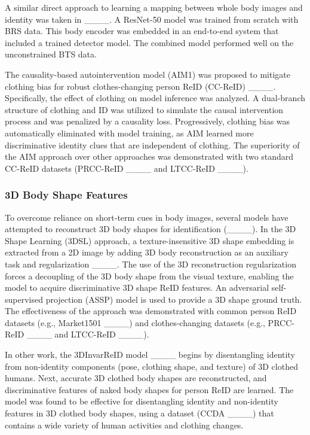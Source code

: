 A similar direct approach to learning a mapping between 
whole body images and identity was taken in ____.  A ResNet-50 model was trained from scratch
with BRS data. This body encoder was embedded
in an end-to-end system that included a trained detector
model. The combined model performed well on the unconstrained BTS data.

The causality-based autointervention model (AIM1) was
proposed to mitigate clothing bias for robust clothes-changing person ReID
(CC-ReID) ____. Specifically, 
 the effect of clothing
on model inference was analyzed. A dual-branch structure of clothing and ID was
utilized to simulate the causal intervention process and 
was penalized by a causality loss. Progressively, clothing bias
was  automatically eliminated with model training, as AIM
 learned more discriminative identity clues that are
independent of clothing. The  superiority of the
 AIM approach over other approaches was demonstrated
 with two standard CC-ReID datasets (PRCC-ReID ____ and  LTCC-ReID ____). 
 


\subsubsection{3D Body Shape Features}
To overcome reliance on short-term cues in body images,
several models have attempted to reconstruct 3D body shapes for
identification (____).
In the 3D Shape Learning (3DSL) approach, a texture-insensitive 3D shape embedding is extracted
from a 2D image by adding 3D body reconstruction as an
auxiliary task and regularization ____. 
The use of the 3D reconstruction regularization
forces a  decoupling of the 3D body shape from the visual texture, 
enabling the model to acquire discriminative 3D
shape ReID features.  An adversarial self-supervised 
projection (ASSP) model is used to provide a 3D shape ground truth. The effectiveness of the approach was
demonstrated with common person ReID
datasets (e.g., Market1501 ____) and clothes-changing datasets (e.g., PRCC-ReID ____ and  LTCC-ReID ____).

In other work, the 3DInvarReID model ____ begins by
disentangling identity from
non-identity components (pose, clothing shape, and texture)
of 3D clothed humans. Next, 
 accurate 3D
clothed body shapes are reconstructed,
and discriminative  features
of naked body shapes for person ReID are learned. The model was found to be effective for disentangling identity and non-identity features in 3D clothed
body shapes,  using a dataset (CCDA ____) that contains a wide variety of human activities and clothing changes.

